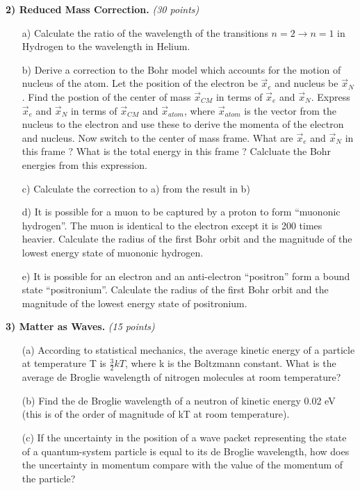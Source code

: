 {\large
  
\textbf{2) Reduced Mass Correction. } \hfill \textit{(30 points)}
\begin{itemize}
\item[a)] Calculate the ratio of the wavelength of the transitions $n=2 \rightarrow n=1 $ in Hydrogen to the wavelength in Helium.
\item[b)] Derive a correction to the Bohr model which accounts for the motion of nucleus of the atom.  Let the position of the electron be $\vec{x}_e$ and nucleus be $\vec{x}_N$. Find the postion of the center of mass $\vec{x}_{CM}$ in terms of $\vec{x}_e$ and $\vec{x}_N$. Express $\vec{x}_e$ and $\vec{x}_N$ in terms of $\vec{x}_{CM}$ and $\vec{x}_{atom}$, where $\vec{x}_{atom}$ is the vector from the nucleus to the electron and use these to derive the momenta of the electron and nucleus. Now switch to the center of mass frame. What are $\vec{x}_e$ and $\vec{x}_N$ in this frame ? What is the total energy in this frame ? Calcluate the Bohr energies from this expression. 
\item[c)] Calculate the correction to a) from the result in b)
\item[d)] It is possible for a muon to be captured by a proton to form ``muononic hydrogen''. The muon is identical to the electron except it is 200 times heavier. Calculate the radius of the first Bohr orbit and the magnitude of the lowest energy state of muononic hydrogen.
\item[e)] It is possible for an electron and an anti-electron ``positron'' form a bound state ``positronium''. Calculate the radius of the first Bohr orbit and the magnitude of the lowest energy state  of positronium.
\end{itemize}

\textbf{3) Matter as Waves. }\hfill \textit{(15 points)}
\begin{itemize}
\item[(a)]
According to statistical mechanics, the average kinetic energy of a particle at temperature T is $\frac{3}{2}kT$, where k is the Boltzmann constant. 
What is the average de Broglie wavelength of nitrogen molecules at room temperature?

\item[(b)]
Find the de Broglie wavelength of a neutron of kinetic energy 0.02 eV (this is of the order of magnitude of kT at room temperature).

\item[(c)]
If the uncertainty in the position of a wave packet representing the state of a quantum-system particle is equal to its de Broglie wavelength, how does the uncertainty in momentum compare with the value of the momentum of the particle?


\end{itemize}}
